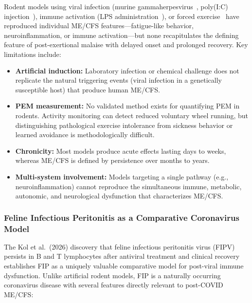 Rodent models using viral infection (murine gammaherpesvirus~\cite{Olivadoti2011mhv68,Dong2017mhv68review}, poly(I:C) injection~\cite{Cunningham2007polyic,Foster2021lpspolyic}), immune activation (LPS administration~\cite{Zhang2016nlrp3fatigue,Foster2021lpspolyic}), or forced exercise~\cite{Ohba2019forcedswim} have reproduced individual ME/CFS features---fatigue-like behavior, neuroinflammation, or immune activation---but none recapitulates the defining feature of post-exertional malaise with delayed onset and prolonged recovery. Key limitations include:

\begin{itemize}
    \item \textbf{Artificial induction:} Laboratory infection or chemical challenge does not replicate the natural triggering events (viral infection in a genetically susceptible host) that produce human ME/CFS.
    \item \textbf{PEM measurement:} No validated method exists for quantifying PEM in rodents. Activity monitoring can detect reduced voluntary wheel running, but distinguishing pathological exercise intolerance from sickness behavior or learned avoidance is methodologically difficult.
    \item \textbf{Chronicity:} Most models produce acute effects lasting days to weeks, whereas ME/CFS is defined by persistence over months to years.
    \item \textbf{Multi-system involvement:} Models targeting a single pathway (e.g., neuroinflammation) cannot reproduce the simultaneous immune, metabolic, autonomic, and neurological dysfunction that characterizes ME/CFS.
\end{itemize}

\subsubsection{Feline Infectious Peritonitis as a Comparative Coronavirus Model}

The Kol et al.\ (2026) discovery that feline infectious peritonitis virus (FIPV) persists in B and T lymphocytes after antiviral treatment and clinical recovery~\cite{Kol2026fipv} establishes FIP as a uniquely valuable comparative model for post-viral immune dysfunction. Unlike artificial rodent models, FIP is a naturally occurring coronavirus disease with several features directly relevant to post-COVID ME/CFS:

